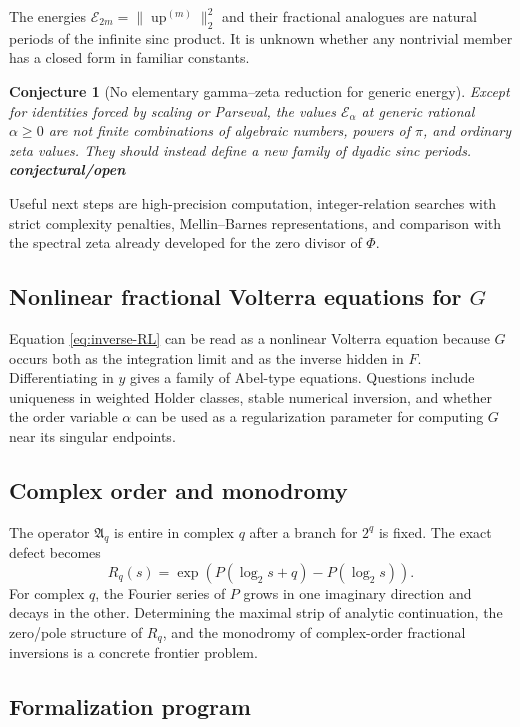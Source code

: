 \documentclass[11pt]{article}
\newcommand{\statusopen}{\textcolor{statusred}{\textbf{conjectural/open}}}
\newtheorem{conjecture}[theorem]{Conjecture}
\theoremstyle{definition}
\theoremstyle{remark}
\newcommand{\Up}{\operatorname{up}}
\newcommand{\Aop}{\mathfrak A}
\newcommand{\Phiup}{\Phi}
\begin{document}
The energies $\mathcal E_{2m}=\|\Up^{(m)}\|_2^2$ and their fractional analogues are natural
periods of the infinite sinc product.  It is unknown whether any nontrivial member has a
closed form in familiar constants.

\begin{conjecture}[No elementary gamma--zeta reduction for generic energy]
Except for identities forced by scaling or Parseval, the values $\mathcal E_\alpha$ at generic
rational $\alpha\ge0$ are not finite combinations of algebraic numbers, powers of $\pi$, and
ordinary zeta values.  They should instead define a new family of dyadic sinc periods.
\statusopen
\end{conjecture}

Useful next steps are high-precision computation, integer-relation searches with strict
complexity penalties, Mellin--Barnes representations, and comparison with the spectral zeta
already developed for the zero divisor of $\Phiup$.

\subsection{Nonlinear fractional Volterra equations for $G$}

Equation \cref{eq:inverse-RL} can be read as a nonlinear Volterra equation because $G$ occurs
both as the integration limit and as the inverse hidden in $F$.  Differentiating in $y$ gives a
family of Abel-type equations.  Questions include uniqueness in weighted Holder classes,
stable numerical inversion, and whether the order variable $\alpha$ can be used as a
regularization parameter for computing $G$ near its singular endpoints.

\subsection{Complex order and monodromy}

The operator $\Aop_q$ is entire in complex $q$ after a branch for $2^q$ is fixed.  The exact
defect becomes
\[
 R_q(s)=\exp(P(\log_2s+q)-P(\log_2s)).
\]
For complex $q$, the Fourier series of $P$ grows in one imaginary direction and decays in the
other.  Determining the maximal strip of analytic continuation, the zero/pole structure of
$R_q$, and the monodromy of complex-order fractional inversions is a concrete frontier
problem.

\subsection{Formalization program}
\end{document}
